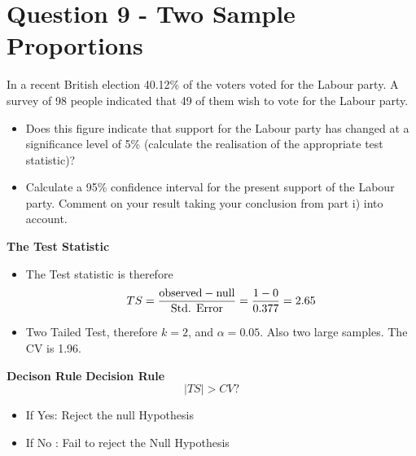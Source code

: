 
\section*{Question 9 - Two Sample Proportions}
In a recent British election 40.12\% of the voters voted for the Labour party. A survey of 98 people indicated that 49 of them wish to vote for the Labour party. 
\begin{itemize}
\item  Does this figure indicate that support for the Labour party has changed at a significance level of 5\% (calculate the realisation of the appropriate test statistic)? 
\item  Calculate a 95\% confidence interval for the present support of the Labour party. Comment on your result taking your conclusion from part i) into account. 
\end{itemize}



\noindent \textbf{The Test Statistic}
\begin{itemize}
\item The Test statistic is therefore
\[ TS = {\mbox{observed} - \mbox{null} \over \mbox{Std. Error}}  = {1 - 0 \over 0.377 } = 2.65 \]
\item Two Tailed Test, therefore $k = 2$, and $\alpha = 0.05$. Also two large samples. The CV is 1.96.
\end{itemize}




\noindent \textbf{Decison Rule}
\textbf{Decision Rule}
\[ |TS| > CV ?  \]
\begin{itemize}
\item If Yes: Reject the null Hypothesis
\item If No : Fail to reject the Null Hypothesis
\end{itemize}
